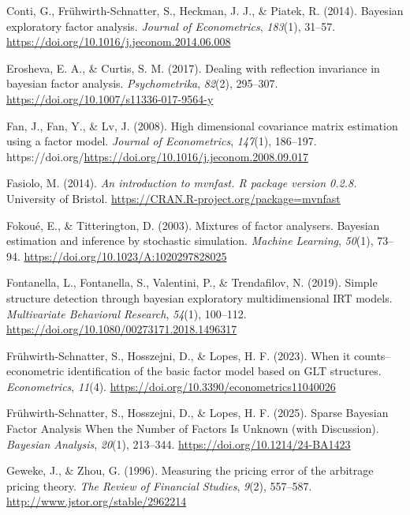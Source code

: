 \documentclass[
  man,
  longtable,
  nolmodern,
  notxfonts,
  notimes,
  colorlinks=true,linkcolor=blue,citecolor=blue,urlcolor=blue]{apa7}
\newlength{\cslhangindent}
\newenvironment{CSLReferences}[2] %
 {\begin{list}{}{%
  \setlength{\itemindent}{0pt}
  \setlength{\leftmargin}{0pt}
  \setlength{\parsep}{0pt}
  \ifodd #1
   \setlength{\leftmargin}{\cslhangindent}
   \setlength{\itemindent}{-1\cslhangindent}
  \fi
  \setlength{\itemsep}{#2\baselineskip}}}
 {\end{list}}
\theoremstyle{plain}
\theoremstyle{plain}
\theoremstyle{remark}
\begin{document}
\begin{CSLReferences}{1}{0}
Conti, G., Frühwirth-Schnatter, S., Heckman, J. J., \& Piatek, R.
(2014). {Bayesian} exploratory factor analysis. \emph{Journal of
Econometrics}, \emph{183}(1), 31--57.
\url{https://doi.org/10.1016/j.jeconom.2014.06.008}

Erosheva, E. A., \& Curtis, S. M. (2017). Dealing with reflection
invariance in bayesian factor analysis. \emph{Psychometrika},
\emph{82}(2), 295--307. \url{https://doi.org/10.1007/s11336-017-9564-y}

Fan, J., Fan, Y., \& Lv, J. (2008). High dimensional covariance matrix
estimation using a factor model. \emph{Journal of Econometrics},
\emph{147}(1), 186--197.
https://doi.org/\url{https://doi.org/10.1016/j.jeconom.2008.09.017}

Fasiolo, M. (2014). \emph{An introduction to mvnfast. R package version
0.2.8.} University of Bristol.
\url{https://CRAN.R-project.org/package=mvnfast}

Fokoué, E., \& Titterington, D. (2003). Mixtures of factor analysers.
Bayesian estimation and inference by stochastic simulation.
\emph{Machine Learning}, \emph{50}(1), 73--94.
\url{https://doi.org/10.1023/A:1020297828025}

Fontanella, L., Fontanella, S., Valentini, P., \& Trendafilov, N.
(2019). Simple structure detection through bayesian exploratory
multidimensional IRT models. \emph{Multivariate Behavioral Research},
\emph{54}(1), 100--112.
\url{https://doi.org/10.1080/00273171.2018.1496317}

Frühwirth-Schnatter, S., Hosszejni, D., \& Lopes, H. F. (2023). When it
counts--econometric identification of the basic factor model based on
GLT structures. \emph{Econometrics}, \emph{11}(4).
\url{https://doi.org/10.3390/econometrics11040026}

Frühwirth-Schnatter, S., Hosszejni, D., \& Lopes, H. F. (2025). {Sparse
Bayesian Factor Analysis When the Number of Factors Is Unknown (with
Discussion)}. \emph{Bayesian Analysis}, \emph{20}(1), 213--344.
\url{https://doi.org/10.1214/24-BA1423}

Geweke, J., \& Zhou, G. (1996). Measuring the pricing error of the
arbitrage pricing theory. \emph{The Review of Financial Studies},
\emph{9}(2), 557--587. \url{http://www.jstor.org/stable/2962214}


\end{CSLReferences}
\end{document}
